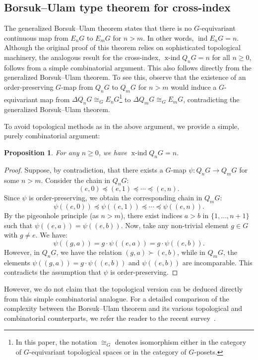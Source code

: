 \documentclass[preprint,12pt]{article}
\renewcommand{\ge}{\geqslant}
\newtheorem{proposition}[theorem]{Proposition}
\theoremstyle{definition}
\theoremstyle{remark}
\numberwithin{equation}{section}
\DeclareMathOperator{\ind}{ind}
\DeclareMathOperator{\xind}{x-ind}
\begin{document}
\subsection{Borsuk--Ulam type theorem for cross-index}

\label{Subsection: Borsuk}
The generalized Borsuk--Ulam theorem states that there is no $G$-equivariant continuous map from $E_nG$ to $E_mG$ for $n > m$. In other words, $\ind E_nG = n$. Although the original proof of this theorem relies on sophisticated topological machinery, the analogous result for the cross-index, $\xind Q_nG = n$ for all $n \ge 0$, follows from a simple combinatorial argument. This also follows directly from the generalized Borsuk–Ulam theorem. To see this, observe that the existence of an order-preserving $G$-map from $Q_nG$ to $Q_mG$ for $n > m$ would induce a $G$-equivariant map from $\Delta Q_nG \cong_{G} E_nG$\footnote{In this paper, the notation $\cong_{G}$ denotes isomorphism either in the category of $G$-equivariant topological spaces or in the category of $G$-posets.} to $\Delta  Q_mG \cong_{G} E_mG$, contradicting the generalized Borsuk--Ulam theorem. 

To avoid topological methods as in the above argument, we provide a simple, purely combinatorial argument:

\begin{proposition}\label{prop:xind}
For any $n \ge 0$, we have $\xind Q_nG = n$.
\end{proposition}

\begin{proof}
Suppose, by contradiction, that there exists a $G$-map $\psi \colon Q_nG \to Q_mG$ for some $n > m$. Consider the chain in $Q_nG$:
\[
(e, 0) \preceq (e, 1) \preceq\cdots \preceq (e, n).
\]
Since $\psi$ is order-preserving, we obtain the corresponding chain in $Q_mG$:
\[
\psi((e, 0)) \preceq \psi((e, 1)) \preceq \cdots \preceq \psi((e, n)).
\]
By the pigeonhole principle (as $n > m$), there exist indices $a > b$ in $\{1, \ldots, n+1\}$ such that $\psi((e, a)) = \psi((e, b))$. Now, take any non-trivial element $g \in G$ with $g \neq e$. We have:
\[
\psi((g, a)) = g \cdot \psi((e, a)) = g \cdot \psi((e, b)).
\]
However, in $Q_nG$, we have the relation $(g, a) \succ (e, b)$, while in $Q_mG$, the elements $\psi((g, a)) = g \cdot \psi((e, b))$ and $\psi((e, b))$ are incomparable. This contradicts the assumption that $\psi$ is order-preserving.
\end{proof}
However, we do not claim that the topological version can be deduced directly from this simple combinatorial analogue. For a detailed comparison of the complexity between the Borsuk--Ulam theorem and its various topological and combinatorial counterparts, we refer the reader to the recent survey~\cite{daneshpajouh2025box}.
\end{document}

